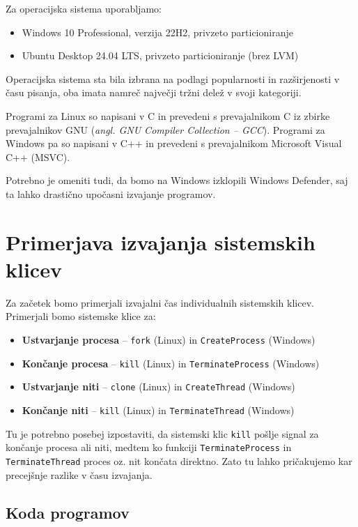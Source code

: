 \documentclass[a4paper,12pt,openright]{book}
\begin{document}
Za operacijska sistema uporabljamo:
\begin{itemize}
	\item Windows 10 Professional, verzija 22H2, privzeto particioniranje
	\item Ubuntu Desktop 24.04 LTS, privzeto particioniranje (brez LVM)
\end{itemize}
Operacijska sistema sta bila izbrana na podlagi popularnosti in razširjenosti v času pisanja, oba imata namreč največji tržni delež v svoji kategoriji.

Programi za Linux so napisani v C in prevedeni s prevajalnikom C iz zbirke prevajalnikov GNU (\textit{angl. GNU Compiler Collection -- GCC}).
Programi za Windows pa so napisani v C++ in prevedeni s prevajalnikom Microsoft Visual C++ (MSVC).

Potrebno je omeniti tudi, da bomo na Windows izklopili Windows Defender, saj ta lahko drastično upočasni izvajanje programov.

\section{Primerjava izvajanja sistemskih klicev}

Za začetek bomo primerjali izvajalni čas individualnih sistemskih klicev.
Primerjali bomo sistemske klice za:
\begin{itemize}
	\item \textbf{Ustvarjanje procesa} -- \texttt{fork} (Linux) in \texttt{CreateProcess} (Windows)
	\item \textbf{Končanje procesa} -- \texttt{kill} (Linux) in \texttt{TerminateProcess} (Windows)
	\item \textbf{Ustvarjanje niti} -- \texttt{clone} (Linux) in \texttt{CreateThread} (Windows)
	\item \textbf{Končanje niti} -- \texttt{kill} (Linux) in \texttt{TerminateThread} (Windows)
\end{itemize}

Tu je potrebno posebej izpostaviti, da sistemski klic \texttt{kill} pošlje signal za končanje procesa ali niti, medtem ko funkciji \texttt{TerminateProcess} in \texttt{Terminate\-Thread} proces oz. nit končata direktno.
Zato tu lahko pričakujemo kar precejšnje razlike v času izvajanja.

\subsection{Koda programov}
\end{document}
